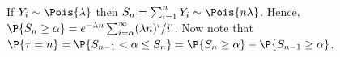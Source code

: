 
\setcounter{theorem}{31}

If $Y_{i} \sim \Pois{\lambda}$ then $S_{n}=\sum_{i=1}^n Y_{i} \sim \Pois{n \lambda}$. Hence, $\P{S_n\geq \alpha}=e^{-\lambda n} \sum_{i=\alpha}^{\infty}(\lambda n)^i/i!$.
Now note that $\P{\tau = n} = \P{S_{n-1}<\alpha \leq S_{n}} = \P{S_n\geq \alpha} - \P{S_{n-1}\geq \alpha}$.


